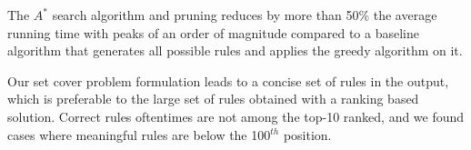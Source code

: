\noindent {} The $A^*$ search algorithm and pruning reduces by more than 50\% the average running time with peaks of an order of magnitude compared to a baseline algorithm that generates all possible rules and applies the greedy algorithm on it.

\noindent {} Our set cover problem formulation leads to a concise set of rules in the output, which is preferable to the large set of rules obtained with a ranking based solution. Correct rules oftentimes are not among the top-10 ranked, and we found cases where meaningful rules are below the 100$^{th}$ position.
	

